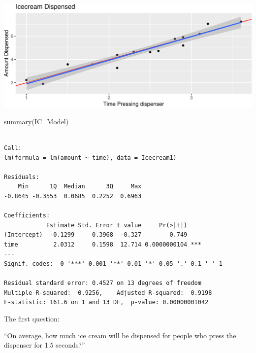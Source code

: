\documentclass[
  letterpaper,
  DIV=11,
  numbers=noendperiod]{scrreprt}
\newenvironment{Shaded}{\begin{snugshade}}{\end{snugshade}}
\newcommand{\DecValTok}[1]{\textcolor[rgb]{0.68,0.00,0.00}{#1}}
\newcommand{\FunctionTok}[1]{\textcolor[rgb]{0.28,0.35,0.67}{#1}}
\newcommand{\NormalTok}[1]{\textcolor[rgb]{0.00,0.23,0.31}{#1}}
\newcommand{\OtherTok}[1]{\textcolor[rgb]{0.00,0.23,0.31}{#1}}
\newcommand{\SpecialCharTok}[1]{\textcolor[rgb]{0.37,0.37,0.37}{#1}}
\begin{document}
\includegraphics{Ch4_files/figure-pdf/unnamed-chunk-73-1.pdf}

\begin{Shaded}
\begin{Highlighting}[]
\FunctionTok{summary}\NormalTok{(IC\_Model)}
\end{Highlighting}
\end{Shaded}

\begin{verbatim}

Call:
lm(formula = lm(amount ~ time), data = Icecream1)

Residuals:
    Min      1Q  Median      3Q     Max 
-0.8645 -0.3553  0.0685  0.2252  0.6963 

Coefficients:
            Estimate Std. Error t value     Pr(>|t|)    
(Intercept)  -0.1299     0.3968  -0.327        0.749    
time          2.0312     0.1598  12.714 0.0000000104 ***
---
Signif. codes:  0 '***' 0.001 '**' 0.01 '*' 0.05 '.' 0.1 ' ' 1

Residual standard error: 0.4527 on 13 degrees of freedom
Multiple R-squared:  0.9256,    Adjusted R-squared:  0.9198 
F-statistic: 161.6 on 1 and 13 DF,  p-value: 0.00000001042
\end{verbatim}

\begin{Shaded}
\end{Shaded}

The first question:

``On average, how much ice cream will be dispensed for people who press
the dispenser for 1.5 seconds?''
\end{document}
